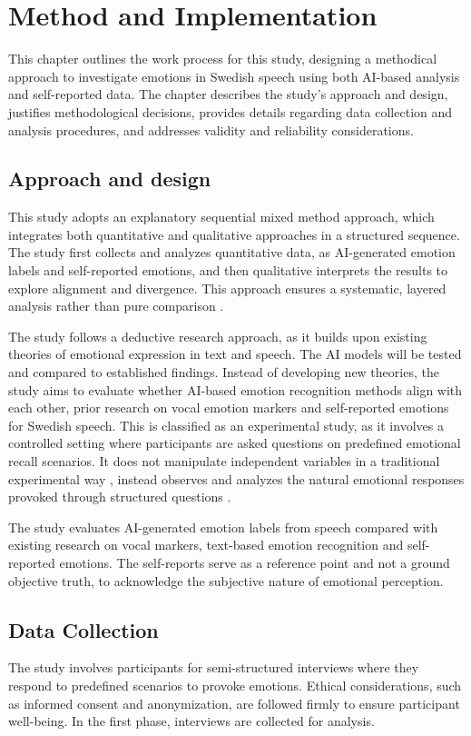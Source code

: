 \chapter{Method and Implementation}

This chapter outlines the work process for this study, designing a methodical approach to investigate emotions in Swedish speech using both AI-based analysis and self-reported data. The chapter describes the study’s approach and design, justifies methodological decisions, provides details regarding data collection and analysis procedures, and addresses validity and reliability considerations. 

\section{Approach and design}
This study adopts an explanatory sequential mixed method approach, which integrates both quantitative and qualitative approaches in a structured sequence. The study first collects and analyzes quantitative data, as AI-generated emotion labels and self-reported emotions, and then qualitative interprets the results to explore alignment and divergence. This approach ensures a systematic, layered analysis rather than pure comparison \autocite{Creswell2023}.  

The study follows a deductive research approach, as it builds upon existing theories of emotional expression in text and speech. The AI models will be tested and compared to established findings. Instead of developing new theories, the study aims to evaluate whether AI-based emotion recognition methods align with each other, prior research on vocal emotion markers and self-reported emotions for Swedish speech. 
This is classified as an experimental study, as it involves a controlled setting where participants are asked questions on predefined emotional recall scenarios. It does not manipulate independent variables in a traditional experimental way \autocite{Creswell2023}, instead observes and analyzes the natural emotional responses provoked through structured questions \autocite{Bryman2022}.

The study evaluates AI-generated emotion labels from speech compared with existing research on vocal markers, text-based emotion recognition and self-reported emotions. The self-reports serve as a reference point and not a ground objective truth, to acknowledge the subjective nature of emotional perception.  

\section{Data Collection}
The study involves participants for semi-structured interviews where they respond to predefined scenarios to provoke emotions. 
Ethical considerations, such as informed consent and anonymization, are followed firmly to ensure participant well-being. In the first phase, interviews are collected for analysis. 

